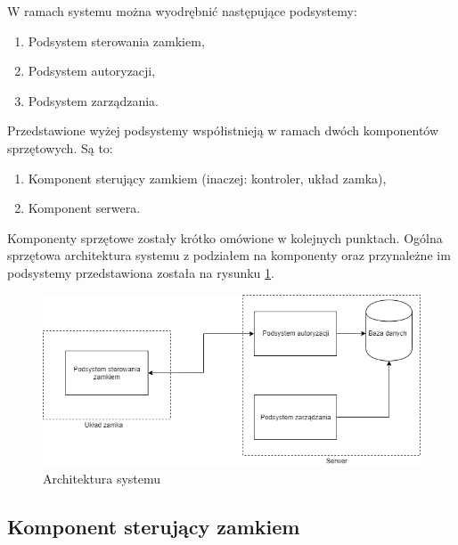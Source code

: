                 W ramach systemu można wyodrębnić następujące podsystemy:
                \begin{enumerate}
                        \item Podsystem sterowania zamkiem,
                        \item Podsystem autoryzacji,
                        \item Podsystem zarządzania.
                \end{enumerate}

                Przedstawione wyżej podsystemy współistnieją w ramach dwóch komponentów sprzętowych. Są to:
                \begin{enumerate}
                        \item Komponent sterujący zamkiem (inaczej: kontroler, układ zamka),
                        \item Komponent serwera.
                \end{enumerate}

                Komponenty sprzętowe zostały krótko omówione w kolejnych punktach. Ogólna sprzętowa architektura systemu z podziałem na komponenty oraz przynależne im podsystemy przedstawiona została na rysunku \ref{fig:hl-arch}.

                \begin{figure}[]
                        \includegraphics[width=\linewidth]{chapters/images/hl-arch3.png}
                        \caption{Architektura systemu}
                        \label{fig:hl-arch}
                \end{figure}

                \subsection{Komponent sterujący zamkiem}

